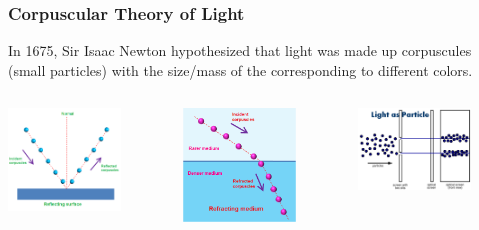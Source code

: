 \documentclass{beamer}
\begin{document}
\begin{frame}\frametitle{Corpuscular Theory of Light}

In 1675, Sir Isaac Newton hypothesized that light was made up corpuscules (small particles) with the size/mass of the corresponding to different colors. 

\begin{columns}
\begin{column}{3.5cm}
\begin{center}
\includegraphics[width=3cm]{fig/corpReflect.png}
\end{center}
\end{column}

\begin{column}{3.5cm}
\begin{center}
\includegraphics[width=3cm]{fig/corpRefract.png}
\end{center}
\end{column}

\begin{column}{3.5cm}
\begin{center}
\includegraphics[width=3cm]{fig/corpDoubleSlit.png}
\end{center}
\end{column}
\end{columns}
\end{frame}
\end{document}
